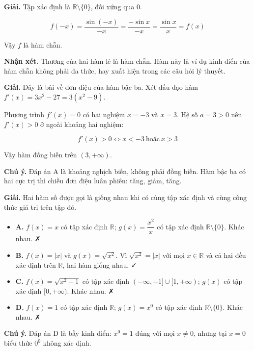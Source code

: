 \documentclass[11pt, a4paper]{article}
\begin{document}
\begin{dapan}[4 — Đáp án B]
\textbf{Giải.} Tập xác định là $\mathbb{R}\setminus\{0\}$, đối xứng qua $0$.

$$f(-x) = \frac{\sin(-x)}{-x} = \frac{-\sin x}{-x} = \frac{\sin x}{x} = f(x)$$

Vậy $f$ là hàm chẵn.

\textbf{Nhận xét.} Thương của hai hàm lẻ là hàm chẵn. Hàm này là ví dụ kinh điển của hàm chẵn không phải đa thức, hay xuất hiện trong các câu hỏi lý thuyết.
\end{dapan}

\begin{dapan}[5 — Đáp án C]
\textbf{Giải.} Đây là bài về đơn điệu của hàm bậc ba. Xét dấu đạo hàm $f'(x) = 3x^2 - 27 = 3(x^2 - 9)$.

Phương trình $f'(x) = 0$ có hai nghiệm $x = -3$ và $x = 3$. Hệ số $a = 3 > 0$ nên $f'(x) > 0$ ở ngoài khoảng hai nghiệm:

$$f'(x) > 0 \iff x < -3 \ \text{hoặc} \ x > 3$$

Vậy hàm đồng biến trên $(3, +\infty)$.

\textbf{Chú ý.} Đáp án A là khoảng nghịch biến, không phải đồng biến. Hàm bậc ba có hai cực trị thì chiều đơn điệu luân phiên: tăng, giảm, tăng.
\end{dapan}

\begin{dapan}[6 — Đáp án B]
\textbf{Giải.} Hai hàm số được gọi là giống nhau khi có cùng tập xác định và cùng công thức giá trị trên tập đó.

\begin{itemize}[leftmargin=1.4em, itemsep=2pt]
\item \textbf{A.} $f(x) = x$ có tập xác định $\mathbb{R}$; $g(x) = \dfrac{x^2}{x}$ có tập xác định $\mathbb{R}\setminus\{0\}$. Khác nhau. ✗
\item \textbf{B.} $f(x) = |x|$ và $g(x) = \sqrt{x^2}$. Vì $\sqrt{x^2} = |x|$ với mọi $x \in \mathbb{R}$ và cả hai đều xác định trên $\mathbb{R}$, hai hàm giống nhau. ✓
\item \textbf{C.} $f(x) = \sqrt{x^2-1}$ có tập xác định $(-\infty,-1]\cup[1,+\infty)$; $g(x)$ có tập xác định $[0,+\infty)$. Khác nhau. ✗
\item \textbf{D.} $f(x) = 1$ có tập xác định $\mathbb{R}$; $g(x) = x^0$ có tập xác định $\mathbb{R}\setminus\{0\}$. Khác nhau. ✗
\end{itemize}


\textbf{Chú ý.} Đáp án D là bẫy kinh điển: $x^0 = 1$ đúng với mọi $x \neq 0$, nhưng tại $x = 0$ biểu thức $0^0$ không xác định.
\end{dapan}
\end{document}
